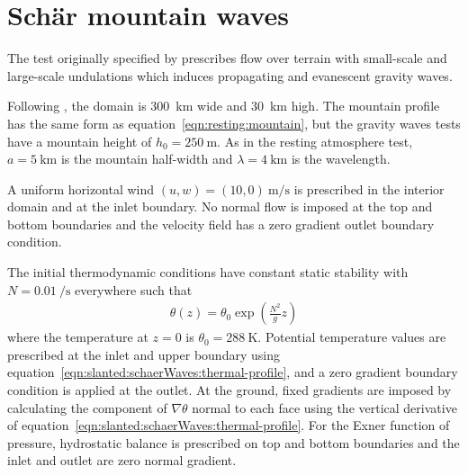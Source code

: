 \section{Sch\"{a}r mountain waves}

The test originally specified by \citet{schaer2002} prescribes flow over terrain with small-scale and large-scale undulations which induces propagating and evanescent gravity waves.  

Following \citet{melvin2010}, the domain is \SI{300}{\kilo\meter} wide and \SI{30}{\kilo\meter} high.
The mountain profile has the same form as equation~\eqref{eqn:resting:mountain}, but the gravity waves tests have a mountain height of $h_0 = \SI{250}{\meter}$.  As in the resting atmosphere test, $a = \SI{5}{\kilo\meter}$ is the mountain half-width and $\lambda = \SI{4}{\kilo\meter}$ is the wavelength.

A uniform horizontal wind $(u, w) = (10, 0)\:\si{\meter\per\second}$ is prescribed in the interior domain and at the inlet boundary.  No normal flow is imposed at the top and bottom boundaries and the velocity field has a zero gradient outlet boundary condition.

The initial thermodynamic conditions have constant static stability with $N = \SI{0.01}{\per\second}$ everywhere such that
\begin{align}
	\theta(z) = \theta_0 \exp \left( \frac{N^2}{g} z \right) \label{eqn:slanted:schaerWaves:thermal-profile}
\end{align}
where the temperature at $z=0$ is $\theta_0 = \SI{288}{\kelvin}$.
Potential temperature values are prescribed at the inlet and upper boundary using equation~\eqref{eqn:slanted:schaerWaves:thermal-profile}, and a zero gradient boundary condition is applied at the outlet.
At the ground, fixed gradients are imposed by calculating the component of $\nabla \theta$ normal to each face using the vertical derivative of equation~\eqref{eqn:slanted:schaerWaves:thermal-profile}.
For the Exner function of pressure, hydrostatic balance is prescribed on top and bottom boundaries and the inlet and outlet are zero normal gradient.

